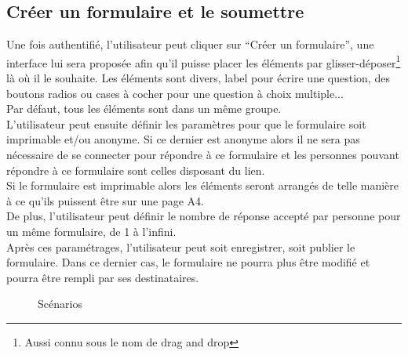 \documentclass{sigplanconf}
\begin{document}
\subsection{Créer un formulaire et le soumettre}
Une fois authentifié, l'utilisateur peut cliquer sur “Créer un formulaire”, une interface lui sera proposée afin qu’il puisse placer les éléments par glisser-déposer\footnote{Aussi connu sous le nom de drag and drop} là où il le souhaite. Les éléments sont divers, label pour écrire une question, des boutons radios ou cases à cocher pour une question à choix multiple...\\
Par défaut, tous les éléments sont dans un même groupe.\\
L’utilisateur peut ensuite définir les paramètres pour que le formulaire soit imprimable et/ou anonyme. Si ce dernier est anonyme alors il ne sera pas nécessaire de se connecter pour répondre à ce formulaire et les personnes pouvant répondre à ce formulaire sont celles disposant du lien.\\
Si le formulaire est imprimable alors les éléments seront arrangés de telle manière à ce qu’ils puissent être sur une page A4.\\
De plus, l’utilisateur peut définir le nombre de réponse accepté par personne pour un même formulaire, de 1 à l’infini.\\
Après ces paramétrages, l’utilisateur peut soit enregistrer, soit publier le formulaire. Dans ce dernier cas, le formulaire ne pourra plus être modifié et pourra être rempli par ses destinataires.\\

\begin{figure}
\begin{center}
\end{center}
\caption{Scénarios}
\label{scenarios}
\end{figure}
\end{document}
